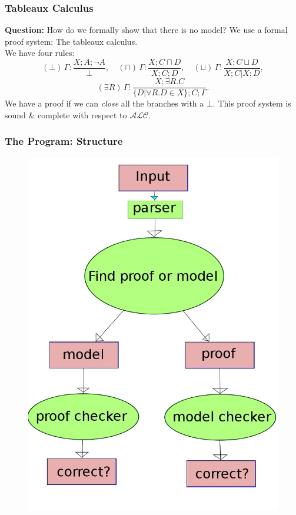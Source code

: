 \begin{frame}
  \frametitle{Tableaux Calculus}
  {\bf Question:} How do we formally show that there is no model?
  \pause
  \bigskip
  We use a formal proof system: The tableaux calculus. \\
  We have four rules:
  \[
  (\bot) \, \Gamma: \frac{X; A; \lnot A}{\bot}, \quad
  (\sqcap) \, \Gamma: \frac{X; C \sqcap D}{X; C; D}, \quad
  (\sqcup) \, \Gamma: \frac{X; C \sqcup D}{X; C | X; D},
  \]
  \[
  (\exists R) \, \Gamma: \frac{X; \exists R. C}{\{D | \forall R.D \in X\};  C ; \Gamma}.
  \]
  \pause
  We have a proof if we can \emph{close} all the branches with a $\bot$.
  \pause
  This proof system is sound \& complete with respect to $\mathcal{ALC}$.
\end{frame}

\begin{frame}
  \frametitle{The Program: Structure}
  \begin{figure}
  \begin{center}
    \includegraphics[scale=0.2]{design.jpeg}
  \end{center}
\end{figure}
\end{frame}

